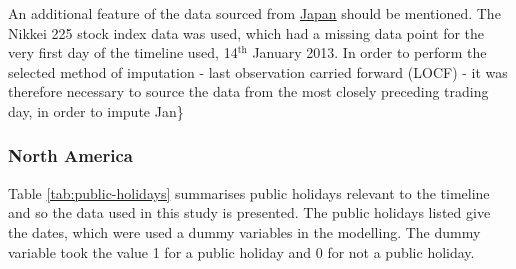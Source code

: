 \documentclass{article}
\begin{document}
An additional feature of the data sourced from \href{http://markets.on.nytimes.com/research/markets/holidays/holidays.asp?display\%3Dmarket&timeOffset\%3D-1&exchange\%3DTYO}{Japan} should be mentioned. The Nikkei 225 stock index data was used, which had a missing data point for the very first day of the timeline used, 14$^{\text{th}}$ January 2013. In order to perform the selected method of imputation - last observation carried forward (LOCF) - it was therefore necessary to source the data from the most closely preceding trading day, in order to impute Jan\}


\subsubsection{North America}
\label{sec-1-2-2}

Table \ref{tab:public-holidays} summarises public holidays relevant to the timeline and so the data used in this study is presented. The public holidays listed give the dates, which were used a dummy variables in the modelling. The dummy variable took the value 1 for a public holiday and 0 for not a public holiday.
\end{document}
